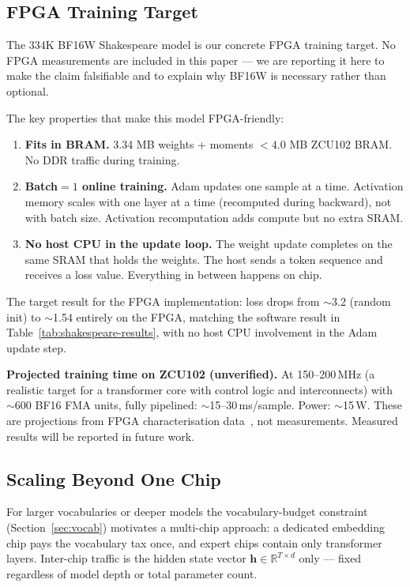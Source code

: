 \documentclass[11pt]{article}
\begin{document}
\label{sec:future}

\subsection{FPGA Training Target}

The 334K BF16W Shakespeare model is our concrete FPGA training target. No FPGA
measurements are included in this paper --- we are reporting it here to make the
claim falsifiable and to explain why BF16W is necessary rather than optional.

The key properties that make this model FPGA-friendly:

\begin{enumerate}
  \item \textbf{Fits in BRAM.} 3.34 MB weights + moments $< 4.0$ MB ZCU102 BRAM.
    No DDR traffic during training.
  \item \textbf{Batch$=1$ online training.} Adam updates one sample at a time.
    Activation memory scales with one layer at a time (recomputed during backward),
    not with batch size. Activation recomputation adds compute but no extra SRAM.
  \item \textbf{No host CPU in the update loop.} The weight update completes on the
    same SRAM that holds the weights. The host sends a token sequence and receives
    a loss value. Everything in between happens on chip.
\end{enumerate}

The target result for the FPGA implementation: loss drops from $\sim$3.2 (random init) to $\sim$1.54
entirely on the FPGA, matching the software result in Table~\ref{tab:shakespeare-results},
with no host CPU involvement in the Adam update step.

\textbf{Projected training time on ZCU102 (unverified).} At 150--200\,MHz (a realistic target for a transformer core with control logic and interconnects) with $\sim$600 BF16 FMA units, fully pipelined: $\sim$15--30\,ms/sample. Power: $\sim$15\,W.
These are projections from FPGA characterisation data~\cite{xilinx_power},
not measurements. Measured results will be reported in future work.

\subsection{Scaling Beyond One Chip}

For larger vocabularies or deeper models the vocabulary-budget constraint
(Section~\ref{sec:vocab}) motivates a multi-chip approach: a dedicated embedding chip
pays the vocabulary tax once, and expert chips contain only transformer layers.
Inter-chip traffic is the hidden state vector $\mathbf{h} \in \mathbb{R}^{T \times d}$
only --- fixed regardless of model depth or total parameter count.
\end{document}
